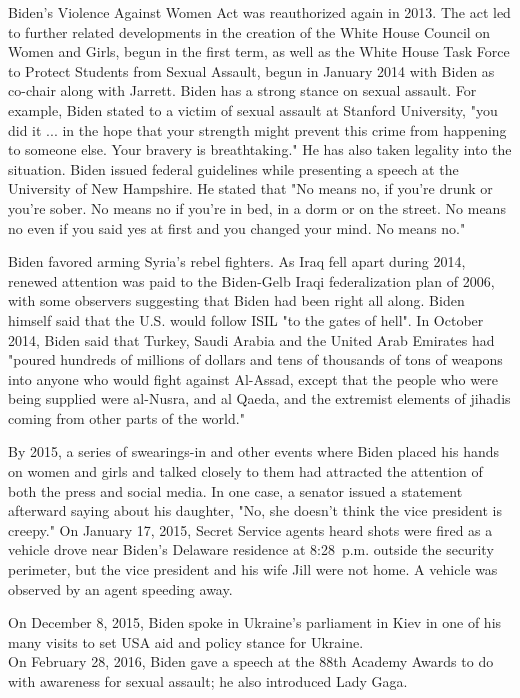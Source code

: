 Biden's Violence Against Women Act was reauthorized again in 2013. The
act led to further related developments in the creation of the White
House Council on Women and Girls, begun in the first term, as well as
the White House Task Force to Protect Students from Sexual Assault,
begun in January 2014 with Biden as co-chair along with Jarrett. Biden
has a strong stance on sexual assault. For example, Biden stated to a
victim of sexual assault at Stanford University, "you did it ... in the
hope that your strength might prevent this crime from happening to
someone else. Your bravery is breathtaking." He has also taken legality
into the situation. Biden issued federal guidelines while presenting a
speech at the University of New Hampshire. He stated that "No means no,
if you're drunk or you're sober. No means no if you're in bed, in a dorm
or on the street. No means no even if you said yes at first and you
changed your mind. No means no."

Biden favored arming Syria's rebel fighters. As Iraq fell apart during
2014, renewed attention was paid to the Biden-Gelb Iraqi federalization
plan of 2006, with some observers suggesting that Biden had been right
all along. Biden himself said that the U.S. would follow ISIL "to the
gates of hell". In October 2014, Biden said that Turkey, Saudi Arabia
and the United Arab Emirates had "poured hundreds of millions of dollars
and tens of thousands of tons of weapons into anyone who would fight
against Al-Assad, except that the people who were being supplied were
al-Nusra, and al Qaeda, and the extremist elements of jihadis coming
from other parts of the world."

By 2015, a series of swearings-in and other events where Biden placed
his hands on women and girls and talked closely to them had attracted
the attention of both the press and social media. In one case, a senator
issued a statement afterward saying about his daughter, "No, she doesn't
think the vice president is creepy." On January 17, 2015, Secret Service
agents heard shots were fired as a vehicle drove near Biden's Delaware
residence at 8:28~p.m. outside the security perimeter, but the vice
president and his wife Jill were not home. A vehicle was observed by an
agent speeding away.

On December 8, 2015, Biden spoke in Ukraine's parliament in Kiev in one
of his many visits to set USA aid and policy stance for Ukraine.\\
On February 28, 2016, Biden gave a speech at the 88th Academy Awards to
do with awareness for sexual assault; he also introduced Lady Gaga.


